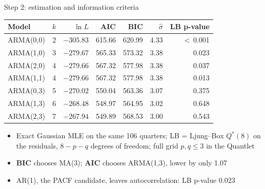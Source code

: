 \begin{frame}{Step 2: estimation and information criteria}
\itemsize{\footnotesize}
\begin{center}
\footnotesize
\begin{tabular}{lrrrrrr}
\toprule
\textbf{Model} & $k$ & $\ln L$ & \textbf{AIC} & \textbf{BIC} & $\hat\sigma$ & \textbf{LB p-value} \\
\midrule
ARMA(0,0) & 2 & $\ensuremath{-}305.83$ & 615.66 & 620.99 & 4.33 & $<$\,0.001 \\
ARMA(1,0) & 3 & $\ensuremath{-}279.67$ & 565.33 & 573.32 & 3.38 & 0.023 \\
ARMA(2,0) & 4 & $\ensuremath{-}279.66$ & 567.32 & 577.98 & 3.38 & 0.037 \\
ARMA(1,1) & 4 & $\ensuremath{-}279.66$ & 567.32 & 577.98 & 3.38 & 0.013 \\
ARMA(0,3) & 5 & $\ensuremath{-}270.02$ & 550.04 & 563.36 & 3.07 & 0.375 \\
ARMA(1,3) & 6 & $\ensuremath{-}268.48$ & 548.97 & 564.95 & 3.02 & 0.648 \\
ARMA(2,3) & 7 & $\ensuremath{-}267.94$ & 549.89 & 568.53 & 3.00 & 0.543 \\
\bottomrule
\end{tabular}
\end{center}
\begin{itemize}
    \item Exact Gaussian MLE on the same 106 quarters; LB = Ljung--Box $Q^*(8)$ on the residuals, $8 - p - q$ degrees of freedom; full grid $p, q \le 3$ in the Quantlet
    \item \textbf{BIC} chooses MA(3); \textbf{AIC} chooses ARMA(1,3), lower by only 1.07
    \item AR(1), the PACF candidate, leaves autocorrelation: LB p-value 0.023
\end{itemize}
\end{frame}

